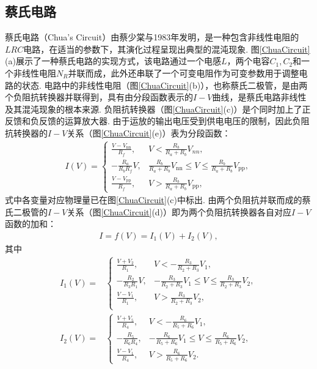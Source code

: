 \documentclass[a4paper, 10pt]{article}
\begin{document}
\begin{multicols*}{2}
\subsection{蔡氏电路}
蔡氏电路（Chua's Circuit）由蔡少棠与1983年发明，是一种包含非线性电阻的$LRC$电路，在适当的参数下，其演化过程呈现出典型的混沌现象. 图\ref{ChuaCircuit}(a)展示了一种蔡氏电路的实现方式，该电路通过一个电感$L$，两个电容$C_1,C_2$和一个非线性电阻$N_R$并联而成，此外还串联了一个可变电阻作为可变参数用于调整电路的状态. 电路中的非线性电阻（图\ref{ChuaCircuit}(b)），也称蔡氏二极管，是由两个负阻抗转换器并联得到，具有由分段函数表示的$I-V$曲线，是蔡氏电路非线性及其混沌现象的根本来源. 负阻抗转换器（图\ref{ChuaCircuit}(c)）是个同时加上了正反馈和负反馈的运算放大器. 由于运放的输出电压受到供电电压的限制，因此负阻抗转换器的$I-V$关系（图\ref{ChuaCircuit}(e)）表为分段函数：
\begin{align}
    I(V)=\left\{\begin{array}{ll}
        \frac{V-V_{\text{nn}}}{R_f},&V<\frac{R_b}{R_a+R_b}V_{nn},\\
        -\frac{R_a}{R_bR_f}V,&\frac{R_b}{R_a+R_b}V_{\text{nn}}\leq V\leq\frac{R_b}{R_a+R_b}V_{\text{pp}},\\
        \frac{V-V_{\text{pp}}}{R_f},&V>\frac{R_b}{R_a+R_b}V_{\text{pp}},
    \end{array}\right.
\end{align}
式中各变量对应物理量已在图\ref{ChuaCircuit}(c)中标出. 由两个负阻抗并联而成的蔡氏二极管的$I-V$关系（图\ref{ChuaCircuit}(d)）即为两个负阻抗转换器各自对应$I-V$函数的加和：
\begin{align}
    I=f(V)=I_1(V)+I_2(V),
\end{align}
其中
\begin{align}
    I_1(V)=&\left\{\begin{array}{ll}
        \frac{V+V_2}{R_1},&V<-\frac{R_3}{R_2+R_3}V_1,\\
        -\frac{R_2}{R_3R_1}V,&-\frac{R_3}{R_2+R_3}V_1\leq V\leq\frac{R_3}{R_2+R_3}V_2,\\
        \frac{V-V_1}{R_1},&V>\frac{R_3}{R_2+R_3}V_2,\\
    \end{array}\right.\\
    I_2(V)=&\left\{\begin{array}{ll}
        \frac{V+V_5}{R_4},&V<-\frac{R_6}{R_5+R_6}V_1,\\
        -\frac{R_5}{R_6R_4},&-\frac{R_6}{R_5+R_6}V_1\leq V\leq\frac{R_6}{R_5+R_6}V_2,\\
        \frac{V-V_1}{R_4},&V>\frac{R_6}{R_5+R_6}V_2.
    \end{array}\right.
\end{align}


\end{multicols*}
\end{document}
